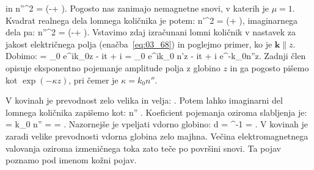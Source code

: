 \eeq
in
\beq
n''^2 = \left(-\varepsilon \mu + \right)\!\!.
\label{eq:03_79}
\eeq
Pogosto nas zanimajo nemagnetne snovi, v katerih je $\mu=1$.
Kvadrat realnega dela lomnega količnika je potem:
\beq
n'^2 = \left(\varepsilon + \right)\!\!,
\label{eq:03_80}
\eeq
imaginarnega dela pa:
\beq
n''^2 = \left(-\varepsilon + \right)\!\!.
\label{eq:03_81}
\eeq
Vstavimo zdaj izračunani lomni količnik v nastavek za jakost električnega polja 
(enačba~\ref{eq:03_68}) in poglejmo
primer, ko je $\mathbf{k} \parallel z$. Dobimo:
\beq
{} = _0 e^{ik_0z - i\omega t + i\delta} = 
_0 e^{ik_0 n'z - i\omega t + i\delta} \cdot e^{-k_0n''z}.
\label{eq:03_82}
\eeq
Zadnji člen opisuje eksponentno pojemanje amplitude polja z globino $z$ in ga pogosto
pišemo kot $\exp(-\kappa z)$, pri čemer je $\kappa = k_0 n''$.

V kovinah je prevodnost zelo velika in velja:
\beq
{} \gg \varepsilon.
\label{eq:03_83}
\eeq
Potem lahko imaginarni del lomnega količnika zapišemo kot:
\beq
n'' \approx {}.
\label{eq:03_84}
\eeq
Koeficient pojemanja oziroma slabljenja je:
\beq
\kappa = k_0 n'' =   = .
\label{eq:03_85}
\eeq
Nazornejše je vpeljati vdorno globino:
\beq
d = \kappa^{-1} = .
\label{eq:03_86}
\eeq
V kovinah je zaradi velike prevodnosti vdorna globina zelo majhna. Večina elektromagnetnega
valovanja oziroma izmeničnega toka zato teče po površini snovi. Ta pojav poznamo pod imenom
kožni pojav.

